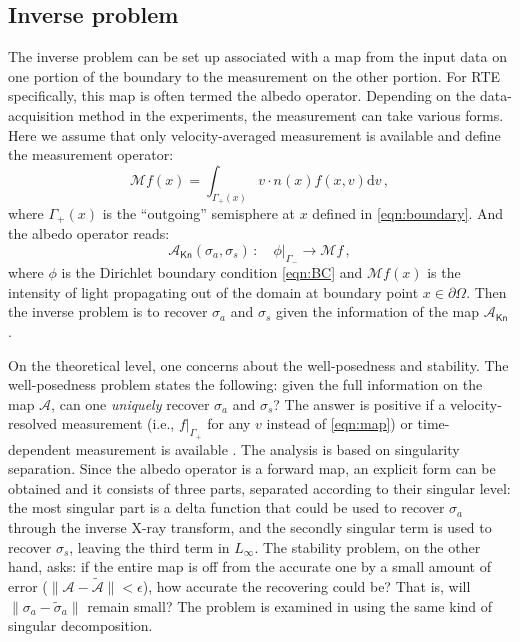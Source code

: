 \documentclass[english,reqno]{amsart}
\theoremstyle{plain}
\theoremstyle{definition} %
\newcommand{\rd}{\mathrm{d}}
\newcommand{\Kn}{\mathsf{Kn}}
\begin{document}
\subsection{Inverse problem}
The inverse problem can be set up associated with a map from the input data on one portion of the boundary to the measurement on the other portion. For RTE specifically, this map is often termed the albedo operator. Depending on the data-acquisition method in the experiments, the measurement can take various forms. Here we assume that only velocity-averaged measurement is available and define the measurement operator:
\begin{equation}
\mathcal{M}f(x) = \int_{\Gamma_+(x)} v\cdot n(x) f(x,v)\rd{v}\,,
\end{equation}
where $\Gamma_+(x)$ is the ``outgoing'' semisphere at $x$ defined in \eqref{eqn:boundary}. And the albedo operator reads:
\begin{equation}\label{eqn:map}
\mathcal{A}_{\Kn}(\sigma_a,\sigma_s)\,:\quad\phi |_{\Gamma_-}\rightarrow\mathcal{M}f\,,
\end{equation}
where $\phi$ is the Dirichlet boundary condition \eqref{eqn:BC} and $\mathcal{M}f(x)$ is the intensity of light propagating out of the domain at boundary point $x\in \partial\Omega$. Then the inverse problem is to recover $\sigma_a$ and $\sigma_s$ given the information of the map $\mathcal{A}_\Kn$. 


On the theoretical level, one concerns about the well-posedness and stability. The well-posedness problem states the following: given the full information on the map $\mathcal{A}$, can one {\it uniquely} recover $\sigma_a$ and $\sigma_s$? The answer is positive if a velocity-resolved measurement (i.e., $f|_{\Gamma_+}$ for any $v$ instead of \eqref{eqn:map}) or time-dependent measurement is available \cite{ChoulliStefenov, Stefenov2}. The analysis is based on singularity separation. Since the albedo operator is a forward map, an explicit form can be obtained and it consists of three parts, separated according to their singular level: the most singular part is a delta function that could be used to recover $\sigma_a$ through the inverse X-ray transform, and the secondly singular term is used to recover $\sigma_s$, leaving the third term in $L_\infty$. The stability problem, on the other hand, asks: if the entire map is off from the accurate one by a small amount of error ($\|\mathcal{A} - \tilde{\mathcal{A}}\|<\epsilon$), how accurate the recovering could be? That is, will $\|\sigma_a - \tilde{\sigma}_a\|$ remain small? The problem is examined in \cite{Bal10a, Bal09, Bal08} using the same kind of singular decomposition.
\end{document}
